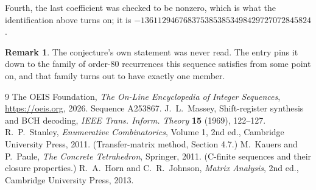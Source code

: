 \documentclass[11pt,a4paper]{article}
\theoremstyle{plain}
\theoremstyle{definition}
\newtheorem{remark}[theorem]{Remark}
\begin{document}
Fourth, the last coefficient was checked to be nonzero, which is what the identification above
turns on; it is $-1361129467683753853853498429727072845824$.

\begin{remark}
The conjecture's own statement was never read. The entry pins it down to the family of
order-$80$ recurrences this sequence satisfies from some point on, and that family turns
out to have exactly one member.
\end{remark}

\begin{thebibliography}{9}
 The OEIS Foundation, \emph{The On-Line Encyclopedia of Integer
Sequences}, \url{https://oeis.org}, 2026. Sequence A253867.
 J.~L.~Massey, Shift-register synthesis and BCH decoding, \emph{IEEE
Trans. Inform. Theory} \textbf{15} (1969), 122--127.
 R.~P.~Stanley, \emph{Enumerative Combinatorics}, Volume 1, 2nd ed.,
Cambridge University Press, 2011. (Transfer-matrix method, Section 4.7.)
 M.~Kauers and P.~Paule, \emph{The Concrete Tetrahedron}, Springer, 2011.
(C-finite sequences and their closure properties.)
 R.~A.~Horn and C.~R.~Johnson, \emph{Matrix Analysis}, 2nd ed., Cambridge
University Press, 2013.
\end{thebibliography}
\end{document}
